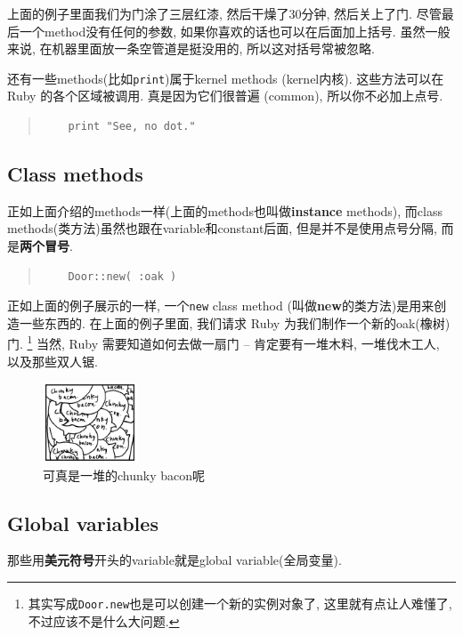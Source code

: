 上面的例子里面我们为门涂了三层红漆, 然后干燥了30分钟, 然后关上了门. 
尽管最后一个method没有任何的参数, 如果你喜欢的话也可以在后面加上括号. 
虽然一般来说, 在机器里面放一条空管道是挺没用的, 所以这对括号常被忽略. 

还有一些methods(比如\texttt{print})属于kernel methods
(kernel内核). 这些方法可以在 Ruby 的各个区域被调用. 真是因为它们很普遍
(common), 所以你不必加上点号. 

\begin{quotation}
  \begin{verbatim}
    print "See, no dot."
  \end{verbatim}
\end{quotation}

\subsection*{Class methods}
正如上面介绍的methods一样(上面的methods也叫做\textbf{instance} 
methods), 而class methods(类方法)虽然也跟在variable和constant后面, 
但是并不是使用点号分隔, 而是\textbf{两个冒号}. 

\begin{quotation}
  \begin{verbatim}
    Door::new( :oak )
  \end{verbatim}
\end{quotation}

正如上面的例子展示的一样, 一个\texttt{new} class method
(叫做\textbf{new}的类方法)是用来创造一些东西的. 在上面的例子里面, 
我们请求 Ruby 为我们制作一个新的oak(橡树)门. 
\footnote{其实写成\texttt{Door.new}也是可以创建一个新的实例对象了, 这里就有点让人难懂了, 不过应该不是什么大问题. }
当然, Ruby 需要知道如何去做一扇门 -- 肯定要有一堆木料, 一堆伐木工人, 
以及那些双人锯. 

\begin{figure}[h]
  \centering
  \includegraphics[width=0.25\textwidth]{image/why/foxes-4e.png}
  \caption{可真是一堆的chunky bacon呢}
\end{figure}

\subsection*{Global variables}
那些用\textbf{美元符号}开头的variable就是global variable(全局变量). 

